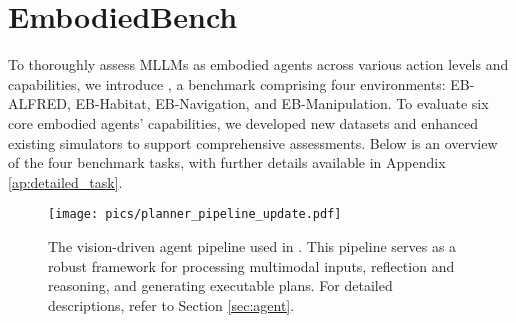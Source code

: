 \section{EmbodiedBench}\label{sec:bench_design}
\vspace{-5pt}
To thoroughly assess MLLMs as embodied agents across various action levels and capabilities, we introduce \name, a benchmark comprising four environments: EB-ALFRED, EB-Habitat, EB-Navigation, and EB-Manipulation. To evaluate six core embodied agents' capabilities, we developed new datasets and enhanced existing simulators to support comprehensive assessments. Below is an overview of the four benchmark tasks, with further details available in Appendix \ref{ap:detailed_task}.




\begin{figure*}[t]
\begin{center}
\texttt{[image: pics/planner\_pipeline\_update.pdf]}
\end{center}
\vspace{-1.3em}
\caption{The vision-driven agent pipeline used in \name. This pipeline serves as a robust framework for processing multimodal inputs, reflection and reasoning, and generating executable plans. For detailed descriptions, refer to Section \ref{sec:agent}.}
\label{fig:agent_pipeline}
\vspace{-1.em}
\end{figure*}




\vspace{-5pt}
